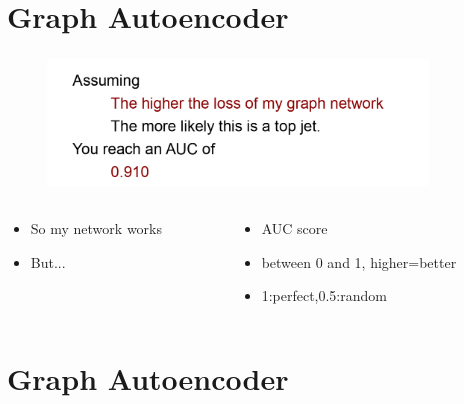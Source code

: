 \documentclass[hyperref={pdfpagelabels=false}]{beamer}
\begin{document}
\section{Graph Autoencoder}\label{sec:Graph Autoencoder}

\begin{frame}[label=]
\frametitle{}
\begin{figure}[H] 
  \centering
\includegraphics[width=0.9\textwidth]{../imgs/netresb}
\label{fig:netresb}
  \end{figure}


\begin{columns}[c] %
\begin{column}{0.48\textwidth}%
\begin{itemize}

    \item So my network works

    \item But...


\end{itemize}
\end{column}%
\hfill%
\begin{column}{0.48\textwidth}%
\begin{itemize}

    \item AUC score

    \item between 0 and 1, higher=better

    \item 1:perfect,0.5:random


\end{itemize}
\end{column}%
\hfill%
\end{columns}

\end{frame}





\newpage
\section{Graph Autoencoder}\label{sec:Graph Autoencoder}
\end{document}
